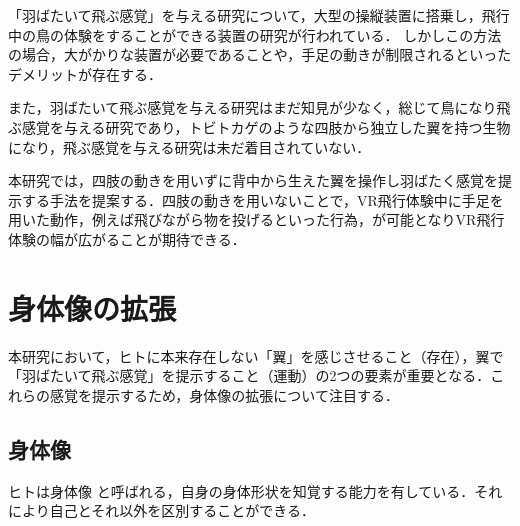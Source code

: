 \begin{small}
    「羽ばたいて飛ぶ感覚」を与える研究について，大型の操縦装置に搭乗し，飛行中の鳥の体験をすることができる装置の研究が行われている\cite{rheiner2014birdly}．
    しかしこの方法の場合，大がかりな装置が必要であることや，手足の動きが制限されるといったデメリットが存在する．
    
    また，羽ばたいて飛ぶ感覚を与える研究はまだ知見が少なく，総じて鳥になり飛ぶ感覚を与える研究であり，トビトカゲのような四肢から独立した翼を持つ生物になり，飛ぶ感覚を与える研究は未だ着目されていない．

    本研究では，四肢の動きを用いずに背中から生えた翼を操作し羽ばたく感覚を提示する手法を提案する．四肢の動きを用いないことで，VR飛行体験中に手足を用いた動作，例えば飛びながら物を投げるといった行為，が可能となりVR飛行体験の幅が広がることが期待できる．

\section{身体像の拡張}
  本研究において，ヒトに本来存在しない「翼」を感じさせること（存在），翼で「羽ばたいて飛ぶ感覚」を提示すること（運動）の2つの要素が重要となる．これらの感覚を提示するため，身体像の拡張について注目する．

  \subsection{身体像}
    ヒトは身体像
    \cite{head1911sensory}と呼ばれる，自身の身体形状を知覚する能力を有している．それにより自己とそれ以外を区別することができる．





\end{small}
